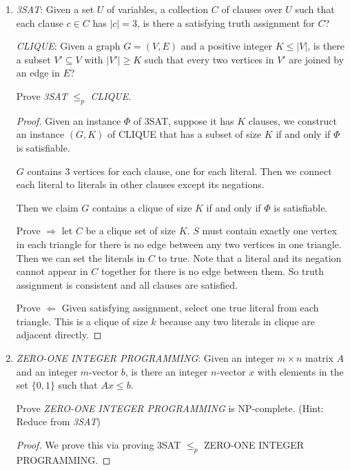 \documentclass[12pt,a4paper]{article}
\theoremstyle{definition}
\begin{document}
\begin{enumerate}
\begin{enumerate}
\begin{proof}
\end{proof}

\end{enumerate}

\item
\emph{3SAT}: Given a set $U$ of variables, a collection $C$ of clauses over $U$ such that each clause $c \in  C$ has $|c| = 3$, is there a satisfying truth assignment for $C$?

\emph{CLIQUE}: Given a graph $G = (V, E)$ and a positive integer $K \leq |V|$, is there a subset $V' \subseteq V$ with $|V'| \geq K$ such that every two vertices in $V'$ are joined by an edge in $E$?

Prove \emph{3SAT} $\leq_p$ \emph{CLIQUE}.

\begin{proof}
	Given an instance $\Phi$ of 3SAT, suppose it has $K$ clauses, we construct an instance $(G,K)$ of CLIQUE that has a subset of size $K$ if and only if $\Phi$ is satisfiable.
	
	$G$ contains $3$ vertices for each clause, one for each literal. Then we connect each literal to literals in other clauses except its negations.

	Then we claim $G$ contains a clique of size $K$ if and only if $\Phi$ is satisfiable.
	
	Prove $\Rightarrow$ let $C$ be a clique set of size $K$. $S$ must contain exactly one vertex in each triangle for there is no edge between any two vertices in one triangle. Then we can set the literals in $C$ to true. Note that a literal and its negation cannot appear in $C$ together for there is no edge between them. So truth assignment is consistent and all clauses are satisfied.
	
	Prove $\Leftarrow$ Given satisfying assignment, select one true literal from each triangle. This is a clique of size $k$ because any two literals in clique are adjacent directly.
	
\end{proof}

\item
\emph{ZERO-ONE INTEGER PROGRAMMING}: Given an integer $m \times n$ matrix $A$ and an integer $m$-vector $b$, is there an integer $n$-vector $x$ with elements in the set $\{0, 1\}$ such that $Ax \leq b$.

Prove \emph{ZERO-ONE INTEGER PROGRAMMING} is NP-complete. (Hint: Reduce from \emph{3SAT})

\begin{proof}
	We prove this via proving 3SAT $\leq_p$ ZERO-ONE INTEGER PROGRAMMING.
	

\end{proof}
\end{enumerate}
\end{document}
